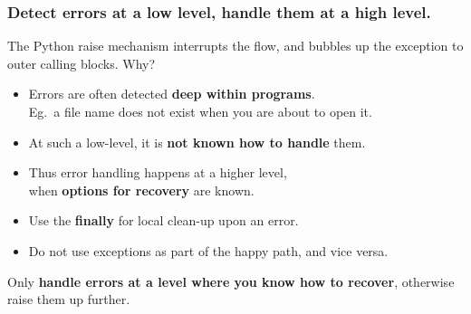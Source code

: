 \documentclass{beamer} %
\newcommand\emc[1]{\textcolor{midred}{\textbf{#1}}}
\begin{document}
\begin{frame}
\frametitle{Detect errors at a low level, handle them at a high level.}

The Python raise mechanism interrupts the flow, and bubbles up the exception to outer calling blocks. Why?
\begin{itemize}
\item Errors are often detected \emc{deep within programs}. \\ Eg.\ a file name does not exist when you are about to open it.
\item At such a low-level, it is \emc{not known how to handle} them.
\item Thus error handling happens at a higher level, \\ when \emc{options for recovery} are known.
\item Use the \emc{finally} for local clean-up upon an error.
\item Do not use exceptions as part of the happy path, and vice versa.
\end{itemize}

\vspace{3mm}
Only \emc{handle errors at a level where you know how to recover}, otherwise raise them up further.

\end{frame}


\end{document}
